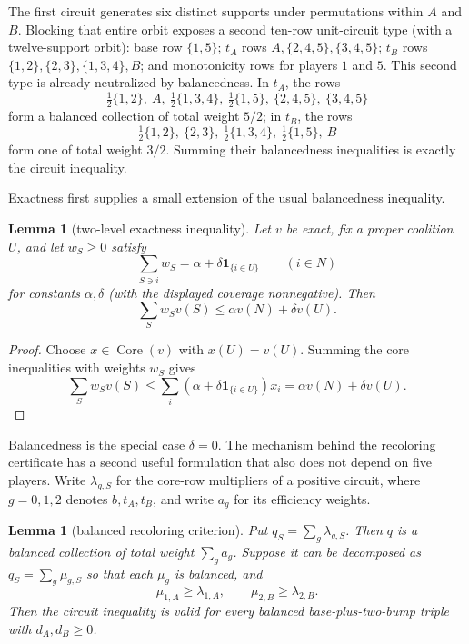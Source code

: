 \documentclass[11pt]{article}
\newtheorem{lemma}[theorem]{Lemma}
\newcommand{\core}{\operatorname{Core}}
\begin{document}
The first circuit generates six distinct supports under permutations within
$A$ and $B$.  Blocking that entire orbit exposes a second ten-row unit-circuit
type (with a twelve-support orbit): base row $\{1,5\}$; $t_A$ rows
$A,\{2,4,5\},\{3,4,5\}$; $t_B$ rows
$\{1,2\},\{2,3\},\{1,3,4\},B$; and monotonicity rows for players $1$ and
$5$.  This second type is already neutralized by balancedness.  In $t_A$, the
rows
\[
\tfrac12\{1,2\},\ A,\ \tfrac12\{1,3,4\},\
\tfrac12\{1,5\},\ \{2,4,5\},\ \{3,4,5\}
\]
form a balanced collection of total weight $5/2$; in $t_B$, the rows
\[
\tfrac12\{1,2\},\ \{2,3\},\ \tfrac12\{1,3,4\},\
\tfrac12\{1,5\},\ B
\]
form one of total weight $3/2$.  Summing their balancedness inequalities is
exactly the circuit inequality.

Exactness first supplies a small extension of the usual balancedness
inequality.

\begin{lemma}[two-level exactness inequality]
\label{lem:two-level-exactness}
Let $v$ be exact, fix a proper coalition $U$, and let $w_S\geq0$ satisfy
\[
 \sum_{S\ni i}w_S=\alpha+\delta\mathbf 1_{\{i\in U\}}
 \qquad(i\in N)
\]
for constants $\alpha,\delta$ (with the displayed coverage nonnegative).
Then
\[
 \sum_Sw_Sv(S)\leq \alpha v(N)+\delta v(U).
\]
\end{lemma}

\begin{proof}
Choose $x\in\core(v)$ with $x(U)=v(U)$. Summing the core inequalities with
weights $w_S$ gives
\[
 \sum_Sw_Sv(S)\leq\sum_i
 (\alpha+\delta\mathbf 1_{\{i\in U\}})x_i
 =\alpha v(N)+\delta v(U).
\]
\end{proof}

Balancedness is the special case $\delta=0$. The mechanism behind the
recoloring certificate has a second useful formulation that also does not
depend on five players. Write $\lambda_{g,S}$ for the core-row multipliers of
a positive circuit, where $g=0,1,2$ denotes $b,t_A,t_B$, and write $a_g$ for
its efficiency weights.

\begin{lemma}[balanced recoloring criterion]
\label{lem:recoloring}
Put $q_S=\sum_g\lambda_{g,S}$. Then $q$ is a balanced collection of total
weight $\sum_g a_g$. Suppose it can be decomposed as
$q_S=\sum_g\mu_{g,S}$ so that each $\mu_g$ is balanced, and
\[
 \mu_{1,A}\geq\lambda_{1,A},\qquad
 \mu_{2,B}\geq\lambda_{2,B}.
\]
Then the circuit inequality is valid for every balanced
base-plus-two-bump triple with $d_A,d_B\geq0$.
\end{lemma}
\end{document}
